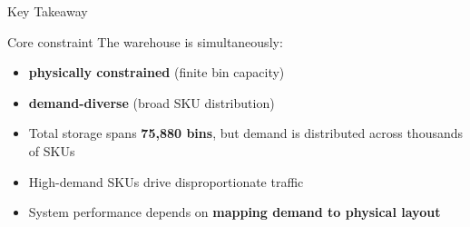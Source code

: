 \documentclass[aspectratio=169, 12pt]{beamer}
\newcommand{\kpi}[1]{\textbf{\color{dhlRed}#1}}
\begin{document}
\begin{frame}{Key Takeaway}

\begin{alertblock}{Core constraint}
The warehouse is simultaneously:
\begin{itemize}
  \item \textbf{physically constrained} (finite bin capacity)
  \item \textbf{demand-diverse} (broad SKU distribution)
\end{itemize}
\end{alertblock}

\vspace{0.5em}

\begin{itemize}
  \item Total storage spans \kpi{75,880 bins}, but demand is distributed across thousands of SKUs
  \item High-demand SKUs drive disproportionate traffic
  \item System performance depends on \textbf{mapping demand to physical layout}
\end{itemize}

\end{frame}
\end{document}
